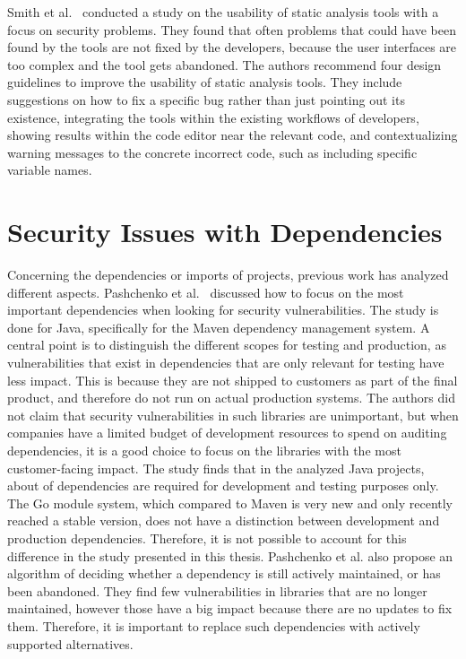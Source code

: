 Smith et al.~\cite{smith2020} conducted a study on the usability of static analysis tools with a focus on security
problems.
They found that often problems that could have been found by the tools are not fixed by the developers, because the user
interfaces are too complex and the tool gets abandoned.
The authors recommend four design guidelines to improve the usability of static analysis tools.
They include suggestions on how to fix a specific bug rather than just pointing out its existence, integrating the tools
within the existing workflows of developers, showing results within the code editor near the relevant code, and
contextualizing warning messages to the concrete incorrect code, such as including specific variable names.



\section{Security Issues with Dependencies}\label{sec:related-work:dependency-issues}

Concerning the dependencies or imports of projects, previous work has analyzed different aspects.
Pashchenko et al.~\cite{pashchenko2018} discussed how to focus on the most important dependencies when looking for
security vulnerabilities.
The study is done for Java, specifically for the Maven dependency management system.
A central point is to distinguish the different scopes for testing and production, as vulnerabilities that exist in
dependencies that are only relevant for testing have less impact.
This is because they are not shipped to customers as part of the final product, and therefore do not run on actual
production systems.
The authors did not claim that security vulnerabilities in such libraries are unimportant, but when companies have a
limited budget of development resources to spend on auditing dependencies, it is a good choice to focus on the libraries
with the most customer-facing impact.
The study finds that in the analyzed Java projects, about  of dependencies are required for development
and testing purposes only.
The Go module system, which compared to Maven is very new and only recently reached a stable version, does not have a
distinction between development and production dependencies.
Therefore, it is not possible to account for this difference in the study presented in this thesis.
Pashchenko et al. also propose an algorithm of deciding whether a dependency is still actively maintained, or has been
abandoned.
They find few vulnerabilities in libraries that are no longer maintained, however those have a big impact because there
are no updates to fix them.
Therefore, it is important to replace such dependencies with actively supported alternatives.

